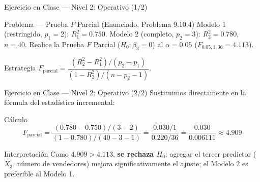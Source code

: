 \documentclass[10pt, aspectratio=169]{beamer}
\begin{document}
\begin{frame}{Ejercicio en Clase --- Nivel 2: Operativo (1/2)}
  \footnotesize
  \begin{block}{Problema --- Prueba $F$ Parcial (Enunciado, Problema 9.10.4)}
    Modelo 1 (restringido, $p_1=2$): $R_1^2=0.750$. Modelo 2 (completo, $p_2=3$): $R_2^2=0.780$, $n=40$. Realice la Prueba $F$ Parcial ($H_0:\beta_3=0$) al $\alpha=0.05$ ($F_{0.05,1,36}=4.113$).
  \end{block}

  \vspace{0.15cm}
  \pause
  \begin{alertblock}{Estrategia}
    \scriptsize
    $F_{\text{parcial}}=\dfrac{(R_2^2-R_1^2)/(p_2-p_1)}{(1-R_2^2)/(n-p_2-1)}$.
  \end{alertblock}
\end{frame}

\begin{frame}{Ejercicio en Clase --- Nivel 2: Operativo (2/2)}
  \scriptsize
  Sustituimos directamente en la fórmula del estadístico incremental: \pause

  \vspace{0.05cm}
  \begin{block}{Cálculo}
    $$F_{\text{parcial}}=\frac{(0.780-0.750)/(3-2)}{(1-0.780)/(40-3-1)}=\frac{0.030/1}{0.220/36}=\frac{0.030}{0.006111}\approx4.909$$
  \end{block}

  \vspace{0.05cm}
  \pause
  \begin{alertblock}{Interpretación}
    Como $4.909>4.113$, \textbf{se rechaza $H_0$}: agregar el tercer predictor ($X_3$, número de vendedores) mejora significativamente el ajuste; el Modelo 2 es preferible al Modelo 1.
  \end{alertblock}
\end{frame}
\end{document}
